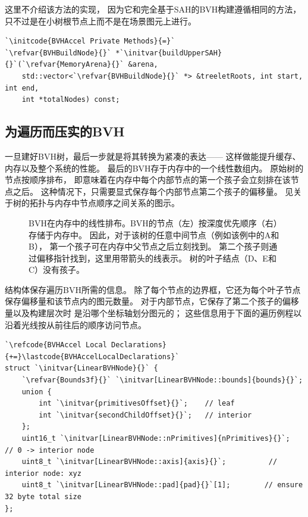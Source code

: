 这里不介绍该方法的实现，
因为它和完全基于SAH的BVH构建遵循相同的方法，
只不过是在小树根节点上而不是在场景图元上进行。
\begin{lstlisting}
`\initcode{BVHAccel Private Methods}{=}`
`\refvar{BVHBuildNode}{}` *`\initvar{buildUpperSAH}{}`(`\refvar{MemoryArena}{}` &arena,
    std::vector<`\refvar{BVHBuildNode}{}` *> &treeletRoots, int start, int end,
    int *totalNodes) const;
\end{lstlisting}

\subsection{为遍历而压实的BVH}
一旦建好BVH树，最后一步就是将其转换为紧凑的表达——
这样做能提升缓存、内存以及整个系统的性能。
最后的BVH存于内存中的一个线性数组内。
原始树的节点按顺序排布，
即意味着在内存中每个内部节点的第一个孩子会立刻排在该节点之后。
这种情况下，只需要显式保存每个内部节点第二个孩子的偏移量。
见关于树的拓扑与内存中节点顺序之间关系的图示。
\begin{figure}[htbp]
    \centering
    \caption{BVH在内存中的线性排布。BVH的节点（左）按深度优先顺序（右）存储于内存中。
        因此，对于该树的任意中间节点（例如该例中的A和B），
        第一个孩子可在内存中父节点之后立刻找到。
        第二个孩子则通过偏移指针找到，这里用带箭头的线表示。
        树的叶子结点（D、E和C）没有孩子。}
    \label{fig:4.13}
\end{figure}

结构体保存遍历BVH所需的信息。
除了每个节点的边界框，它还为每个叶子节点保存偏移量和该节点内的图元数量。
对于内部节点，它保存了第二个孩子的偏移量以及构建层次时
是沿哪个坐标轴划分图元的；
这些信息用于下面的遍历例程以沿着光线按从前往后的顺序访问节点。
\begin{lstlisting}
`\refcode{BVHAccel Local Declarations}{+=}\lastcode{BVHAccelLocalDeclarations}`
struct `\initvar{LinearBVHNode}{}` {
    `\refvar{Bounds3f}{}` `\initvar[LinearBVHNode::bounds]{bounds}{}`;
    union {
        int `\initvar{primitivesOffset}{}`;    // leaf
        int `\initvar{secondChildOffset}{}`;   // interior
    };
    uint16_t `\initvar[LinearBVHNode::nPrimitives]{nPrimitives}{}`;  // 0 -> interior node
    uint8_t `\initvar[LinearBVHNode::axis]{axis}{}`;          // interior node: xyz
    uint8_t `\initvar[LinearBVHNode::pad]{pad}{}`[1];        // ensure 32 byte total size
};
\end{lstlisting}

